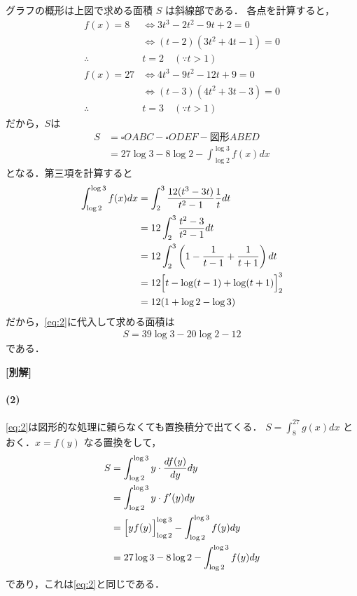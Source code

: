 \documentclass[../../main.tex]{subfiles}
\begin{document}
グラフの概形は上図で求める面積 $S$ は斜線部である．
各点を計算すると，
\begin{align}
  f(x) = 8
  &\iff 3t^3 - 2t^2 - 9t + 2 = 0 \\
  &\iff (t - 2)(3t^2 + 4t - 1) = 0 \\
  \therefore
  &t = 2 \quad (\because t > 1) \\
  f(x) = 27
  &\iff 4t^3 - 9t^2 - 12t + 9 = 0 \\
  &\iff (t - 3)(4t^2 + 3t - 3) = 0 \\
  \therefore
  &t = 3 \quad (\because t > 1)
\end{align}
だから，$S$は
\begin{align}
  S
  &= \square OABC - \square ODEF - \text{図形}ABED \\
  &= 27 \log 3 - 8 \log 2 - \int_{\log 2}^{\log 3} f(x) dx \label{eq:2}
\end{align}
となる．第三項を計算すると
\begin{align}
  \int_{\log 2}^{\log 3} f(x) dx
  &= \int_2^3 \dfrac{12(t^3 - 3t)}{t^2 - 1} \dfrac{1}{t} dt \\
  &= 12 \int_2^3 \dfrac{t^2 - 3}{t^2 - 1} dt \\
  &= 12 \int_2^3 \left( 1 - \dfrac{1}{t - 1} + \dfrac{1}{t + 1} \right) dt \\
  &= 12 \Bigl[ t - \log(t-1) + \log(t+1) \Bigr]_2^3 \\
  &= 12(1 + \log 2 - \log 3)
\end{align}
だから，\cref{eq:2}に代入して求める面積は
\begin{align}
  S = 39 \log 3 - 20 \log 2 - 12
\end{align}
である．

{\bf [別解]}
\paragraph{(2)}

\cref{eq:2}は図形的な処理に頼らなくても置換積分で出てくる．
$S = \int_8^{27} g(x) dx$ とおく．$x = f(y)$ なる置換をして，
\begin{align}
  S
  &= \int_{\log 2}^{\log 3} y \cdot \dfrac{df(y)}{dy} dy \\
  &= \int_{\log 2}^{\log 3} y \cdot f'(y) dy \\
  &= \Bigl[ y f(y) \Bigr]_{\log 2}^{\log 3} - \int_{\log 2}^{\log 3} f(y) dy \\
  &= 27 \log 3 - 8 \log 2 - \int_{\log 2}^{\log 3} f(y) dy
\end{align}
であり，これは\cref{eq:2}と同じである．
\end{document}
